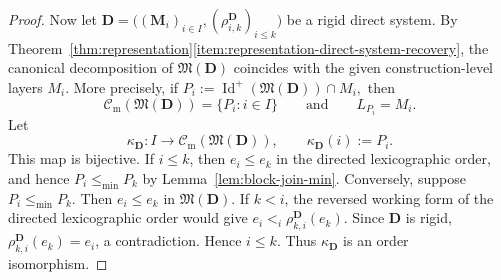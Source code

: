 \documentclass[pdflatex,sn-mathphys-num]{sn-jnl}
\theoremstyle{thmstyleone}%
\theoremstyle{thmstyletwo}%
\theoremstyle{thmstylethree}%
\newcommand{\PosId}{\operatorname{Id}^{+}}
\newcommand{\layer}[1]{L_{#1}}
\newcommand{\Cm}{\mathcal C_{\mathrm m}}
\begin{document}
\begin{proof}
Now let \(\mathbf D=\bigl((\mathbf M_i)_{i\in I},(\rho^{\mathbf D}_{i,k})_{i\le k}\bigr)\) be a rigid direct system.
By Theorem~\ref{thm:representation}\ref{item:representation-direct-system-recovery}, the canonical decomposition of \(\mathfrak M(\mathbf D)\) coincides with the given construction-level layers \(M_i\).
More precisely, if \(P_i:=\PosId(\mathfrak M(\mathbf D))\cap M_i, \) then
\[
\Cm(\mathfrak M(\mathbf D))=\{P_i:i\in I\}
\qquad\text{and}\qquad
\layer{P_i}=M_i.
\]
Let
\[
\kappa_{\mathbf D}\colon I\to \Cm(\mathfrak M(\mathbf D)),
\qquad
\kappa_{\mathbf D}(i):=P_i.
\]
This map is bijective.
If \(i\le k\), then \(e_i\le e_k\) in the directed lexicographic order, and hence \(P_i\le_{\min}P_k\) by Lemma~\ref{lem:block-join-min}.
Conversely, suppose \(P_i\le_{\min}P_k\).
Then \(e_i\le e_k\) in \(\mathfrak M(\mathbf D)\).
If \(k<i\), the reversed working form of the directed lexicographic order would give \(e_i<_i\rho^{\mathbf D}_{k,i}(e_k)\).
Since \(\mathbf D\) is rigid, \(\rho^{\mathbf D}_{k,i}(e_k)=e_i\), a contradiction.
Hence \(i\le k\).
Thus \(\kappa_{\mathbf D}\) is an order isomorphism.


\end{proof}
\end{document}
